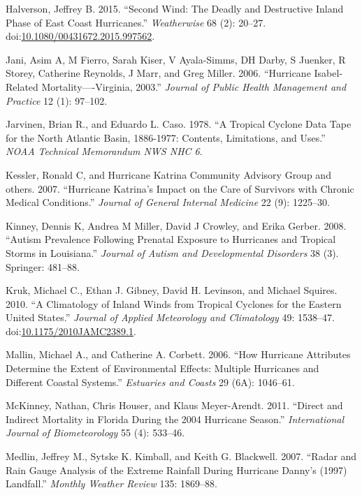 \documentclass[]{elsarticle} %
\begin{document}
\hypertarget{ref-Halverson2015}{}
Halverson, Jeffrey B. 2015. ``Second Wind: The Deadly and Destructive
Inland Phase of East Coast Hurricanes.'' \emph{Weatherwise} 68 (2):
20--27.
doi:\href{https://doi.org/10.1080/00431672.2015.997562}{10.1080/00431672.2015.997562}.

\hypertarget{ref-Jani2006}{}
Jani, Asim A, M Fierro, Sarah Kiser, V Ayala-Simms, DH Darby, S Juenker,
R Storey, Catherine Reynolds, J Marr, and Greg Miller. 2006. ``Hurricane
Isabel-Related Mortality----Virginia, 2003.'' \emph{Journal of Public
Health Management and Practice} 12 (1): 97--102.

\hypertarget{ref-Jarvinen1988}{}
Jarvinen, Brian R., and Eduardo L. Caso. 1978. ``A Tropical Cyclone Data
Tape for the North Atlantic Basin, 1886-1977: Contents, Limitations, and
Uses.'' \emph{NOAA Technical Memorandum NWS NHC 6}.

\hypertarget{ref-Kessler2007}{}
Kessler, Ronald C, and Hurricane Katrina Community Advisory Group and
others. 2007. ``Hurricane Katrina's Impact on the Care of Survivors with
Chronic Medical Conditions.'' \emph{Journal of General Internal
Medicine} 22 (9): 1225--30.

\hypertarget{ref-Kinney2008}{}
Kinney, Dennis K, Andrea M Miller, David J Crowley, and Erika Gerber.
2008. ``Autism Prevalence Following Prenatal Exposure to Hurricanes and
Tropical Storms in Louisiana.'' \emph{Journal of Autism and
Developmental Disorders} 38 (3). Springer: 481--88.

\hypertarget{ref-Kruk2010}{}
Kruk, Michael C., Ethan J. Gibney, David H. Levinson, and Michael
Squires. 2010. ``A Climatology of Inland Winds from Tropical Cyclones
for the Eastern United States.'' \emph{Journal of Applied Meteorology
and Climatology} 49: 1538--47.
doi:\href{https://doi.org/10.1175/2010JAMC2389.1}{10.1175/2010JAMC2389.1}.

\hypertarget{ref-Mallin2006}{}
Mallin, Michael A., and Catherine A. Corbett. 2006. ``How Hurricane
Attributes Determine the Extent of Environmental Effects: Multiple
Hurricanes and Different Coastal Systems.'' \emph{Estuaries and Coasts}
29 (6A): 1046--61.

\hypertarget{ref-Mckinney2011}{}
McKinney, Nathan, Chris Houser, and Klaus Meyer-Arendt. 2011. ``Direct
and Indirect Mortality in Florida During the 2004 Hurricane Season.''
\emph{International Journal of Biometeorology} 55 (4): 533--46.

\hypertarget{ref-Medlin2007}{}
Medlin, Jeffrey M., Sytske K. Kimball, and Keith G. Blackwell. 2007.
``Radar and Rain Gauge Analysis of the Extreme Rainfall During Hurricane
Danny's (1997) Landfall.'' \emph{Monthly Weather Review} 135: 1869--88.
\end{document}
